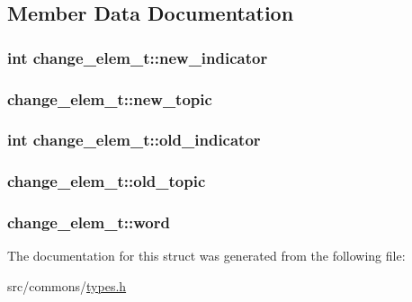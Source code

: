 \subsection{Member Data Documentation}
\hypertarget{structchange__elem__t_ae4bdf198d3b7613de320e1feb6bf308f}{
\subsubsection[{new\_\-indicator}]{\setlength{\rightskip}{0pt plus 5cm}int {\bf change\_\-elem\_\-t::new\_\-indicator}}}
\label{structchange__elem__t_ae4bdf198d3b7613de320e1feb6bf308f}
\hypertarget{structchange__elem__t_afc01a4efa96662c47003ecdbb26abfa0}{
\subsubsection[{new\_\-topic}]{ {\bf change\_\-elem\_\-t::new\_\-topic}}}
\label{structchange__elem__t_afc01a4efa96662c47003ecdbb26abfa0}
\hypertarget{structchange__elem__t_a4bb5251a732bbaf458568bae6e07462c}{
\subsubsection[{old\_\-indicator}]{\setlength{\rightskip}{0pt plus 5cm}int {\bf change\_\-elem\_\-t::old\_\-indicator}}}
\label{structchange__elem__t_a4bb5251a732bbaf458568bae6e07462c}
\hypertarget{structchange__elem__t_a4a2546b42874bf0220340406d2652da8}{
\subsubsection[{old\_\-topic}]{ {\bf change\_\-elem\_\-t::old\_\-topic}}}
\label{structchange__elem__t_a4a2546b42874bf0220340406d2652da8}
\hypertarget{structchange__elem__t_aacc97b4273a214c5becfd36a9b1fb6ba}{
\subsubsection[{word}]{ {\bf change\_\-elem\_\-t::word}}}
\label{structchange__elem__t_aacc97b4273a214c5becfd36a9b1fb6ba}


The documentation for this struct was generated from the following file:\begin{DoxyCompactItemize}
\item 
src/commons/\hyperlink{types_8h}{types.h}\end{DoxyCompactItemize}
